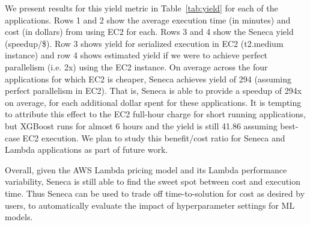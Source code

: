 We present results for this yield metric in Table~\ref{tab:yield} for each of the applications.
Rows 1 and 2 show the average execution time (in minutes) and cost (in dollars) 
from using EC2 for each.
Rows 3 and 4 show the Seneca yield (speedup/\$).
Row 3 shows yield for serialized execution in EC2 (t2.medium
instance) and row 4 shows estimated yield if we were to achieve perfect parallelism
(i.e. 2x) using the EC2 instance. On average across the four applications for which
EC2 is cheaper, Seneca achieves yield of 294 (assuming perfect parallelism in EC2). 
That is, Seneca is able to provide a speedup
of 294x on average, for each additional dollar spent for these applications.
It is tempting to attribute this effect to the EC2 full-hour charge for short
running applications, but XGBoost runs for almost 6 hours and the yield is
still 41.86 assuming best-case EC2 execution.  We plan to study this
benefit/cost ratio for Seneca and Lambda applications 
as part of future work.

Overall, given the AWS Lambda pricing model and its Lambda performance variability, 
Seneca is still able to find the sweet spot between cost 
and execution time. Thus Seneca can be used to trade off time-to-solution 
for cost as desired by users, to automatically evaluate the impact of hyperparameter settings for ML models.

